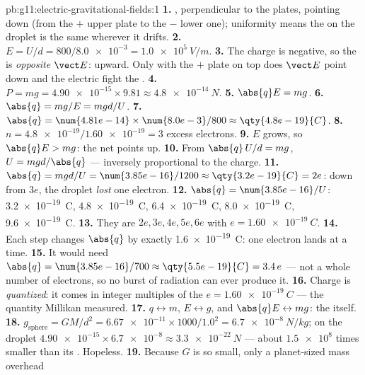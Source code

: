 \begin{solution}{pb:g11:electric-gravitational-fields:1}
\textbf{1.} , perpendicular to the plates, pointing down (from
the $+$ upper plate to the $-$ lower one); uniformity means the 
on the droplet is the same wherever it drifts.
\textbf{2.} $E = U/d = 800 / \num{8.0e-3} = \qty{1.0e5}{V/m}$.
\textbf{3.} The charge is negative, so the  is \emph{opposite}
$\vect E$: upward. Only with the $+$ plate on top does $\vect E$ point
down and the electric  fight the .
\textbf{4.} $P = mg = \num{4.90e-15} \times 9.81 \approx
\qty{4.8e-14}{N}$.
\textbf{5.} $\abs{q}E = mg$.
\textbf{6.} $\abs{q} = mg/E = mgd/U$.
\textbf{7.} $\abs{q} = \num{4.81e-14} \times \num{8.0e-3} / 800
\approx \qty{4.8e-19}{C}$.
\textbf{8.} $n = \num{4.8e-19} / \num{1.60e-19} = 3$ excess electrons.
\textbf{9.} $E$ grows, so $\abs{q}E > mg$: the net  points up.
\textbf{10.} From $\abs{q}\,U/d = mg$, $U = mgd/\abs{q}$ --- inversely
proportional to the charge.
\textbf{11.} $\abs{q} = mgd/U = \num{3.85e-16}/1200 \approx
\qty{3.2e-19}{C} = 2e$: down from $3e$, the droplet \emph{lost} one
electron.
\textbf{12.} $\abs{q} = \num{3.85e-16}/U$: \qty{3.2e-19}{C},
\qty{4.8e-19}{C}, \qty{6.4e-19}{C}, \qty{8.0e-19}{C},
\qty{9.6e-19}{C}.
\textbf{13.} They are $2e, 3e, 4e, 5e, 6e$ with
$e = \qty{1.60e-19}{C}$.
\textbf{14.} Each step changes $\abs{q}$ by exactly
\qty{1.6e-19}{C}: one electron lands at a time.
\textbf{15.} It would need $\abs{q} = \num{3.85e-16}/700 \approx
\qty{5.5e-19}{C} = 3.4\,e$ --- not a whole number of electrons, so no
burst of radiation can ever produce it.
\textbf{16.} Charge is \emph{quantized}: it comes in integer multiples
of the  $e = \qty{1.60e-19}{C}$ --- the quantity
Millikan measured.
\textbf{17.} $q \leftrightarrow m$, $E \leftrightarrow g$, and
$\abs{q}E \leftrightarrow mg$: the  itself.
\textbf{18.} $g_{\text{sphere}} = GM/d^2 = \num{6.67e-11} \times 1000 /
1.0^2 = \qty{6.7e-8}{N/kg}$;  on the droplet
$\num{4.90e-15} \times \num{6.7e-8} \approx \qty{3.3e-22}{N}$ --- about
$\num{1.5e8}$ times smaller than its . Hopeless.
\textbf{19.} Because $G$ is so small, only a planet-sized mass overhead

\end{solution}
